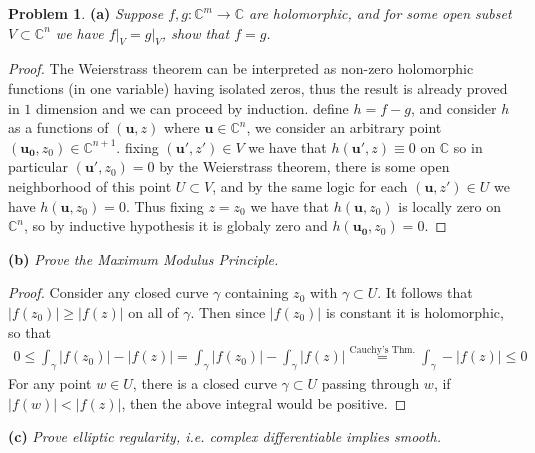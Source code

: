 \documentclass[11pt]{article}
\theoremstyle{definition}
\newtheorem{pb}{Problem}
\newcommand{\abs}[1]{\lvert#1\rvert}
\begin{document}
    \begin{pb}
        \textbf{(a)} \emph{Suppose \(f,g: \mathbb{C}^m \to \mathbb{C}\) are holomorphic, and for some open subset \(V \subset \mathbb{C}^n\) we have \(f\vert_V = g\vert_V\), show that \(f = g\).}
        
        \begin{proof}
            The Weierstrass theorem can be interpreted as non-zero holomorphic functions (in one variable) having isolated zeros, thus the result is already proved in \(1\) dimension and we can proceed by induction. define \(h = f-g\), and consider \(h\) as a functions of \((\mathbf{u},z)\) where \(\mathbf{u} \in \mathbb{C}^n\), we consider an arbitrary point \((\mathbf{u_0},z_0) \in \mathbb{C}^{n+1}\). fixing \((\mathbf{u'},z') \in V\) we have that \(h(\mathbf{u'},z) \equiv 0\) on \(\mathbb{C}\) so in particular \((\mathbf{u'},z_0) = 0\) by the Weierstrass theorem, there is some open neighborhood of this point \(U \subset V\), and by the same logic for each \((\mathbf{u},z') \in U\) we have \(h(\mathbf{u},z_0) = 0\). Thus fixing \(z = z_0\) we have that \(h(\mathbf{u},z_0)\) is locally zero on \(\mathbb{C}^n\), so by inductive hypothesis it is globaly zero and \(h(\mathbf{u_0},z_0) = 0\).
        \end{proof}

        \textbf{(b)} \emph{Prove the Maximum Modulus Principle.}
        
        \begin{proof}
            Consider any closed curve \(\gamma\) containing \(z_0\) with \(\gamma \subset U\). It follows that \(\abs{f(z_0)} \geq \abs{f(z)}\) on all of \(\gamma\). Then since \(\abs{f(z_0)}\) is constant it is holomorphic, so that
            \begin{align*}
                0 \leq \int_\gamma \abs{f(z_0)} - \abs{f(z)} = \int_\gamma \abs{f(z_0)} - \int_\gamma \abs{f(z)} \overset{\text{Cauchy's Thm.}}{=} \int_\gamma - \abs{f(z)} \leq 0
            \end{align*}
            For any point \(w \in U\), there is a closed curve \(\gamma \subset U\) passing through \(w\), if \(\abs{f(w)} < \abs{f(z)}\), then the above integral would be positive.
        \end{proof}

        \textbf{(c)} \emph{Prove elliptic regularity, i.e. complex differentiable implies smooth.}


\end{pb}
\end{document}
